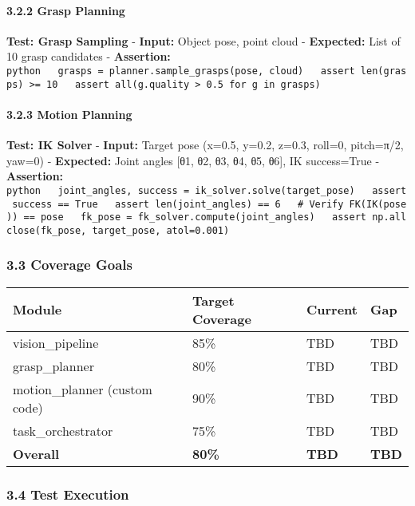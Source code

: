 \documentclass[
]{article}
\begin{document}
\hypertarget{grasp-planning}{%
\paragraph{3.2.2 Grasp Planning}\label{grasp-planning}}

\textbf{Test: Grasp Sampling} - \textbf{Input:} Object pose, point cloud
- \textbf{Expected:} List of 10 grasp candidates - \textbf{Assertion:}
\texttt{python\ \ \ grasps\ =\ planner.sample\_grasps(pose,\ cloud)\ \ \ assert\ len(grasps)\ \textgreater{}=\ 10\ \ \ assert\ all(g.quality\ \textgreater{}\ 0.5\ for\ g\ in\ grasps)}

\hypertarget{motion-planning}{%
\paragraph{3.2.3 Motion Planning}\label{motion-planning}}

\textbf{Test: IK Solver} - \textbf{Input:} Target pose (x=0.5, y=0.2,
z=0.3, roll=0, pitch=π/2, yaw=0) - \textbf{Expected:} Joint angles
{[}θ1, θ2, θ3, θ4, θ5, θ6{]}, IK success=True - \textbf{Assertion:}
\texttt{python\ \ \ joint\_angles,\ success\ =\ ik\_solver.solve(target\_pose)\ \ \ assert\ success\ ==\ True\ \ \ assert\ len(joint\_angles)\ ==\ 6\ \ \ \#\ Verify\ FK(IK(pose))\ ==\ pose\ \ \ fk\_pose\ =\ fk\_solver.compute(joint\_angles)\ \ \ assert\ np.allclose(fk\_pose,\ target\_pose,\ atol=0.001)}

\hypertarget{coverage-goals}{%
\subsubsection{3.3 Coverage Goals}\label{coverage-goals}}

\begin{longtable}[]{@{}llll@{}}
\toprule\noalign{}
\textbf{Module} & \textbf{Target Coverage} & \textbf{Current} &
\textbf{Gap} \\
\midrule\noalign{}
\endhead
\bottomrule\noalign{}
\endlastfoot
vision\_pipeline & 85\% & TBD & TBD \\
grasp\_planner & 80\% & TBD & TBD \\
motion\_planner (custom code) & 90\% & TBD & TBD \\
task\_orchestrator & 75\% & TBD & TBD \\
\textbf{Overall} & \textbf{80\%} & \textbf{TBD} & \textbf{TBD} \\
\end{longtable}

\hypertarget{test-execution}{%
\subsubsection{3.4 Test Execution}\label{test-execution}}
\end{document}
